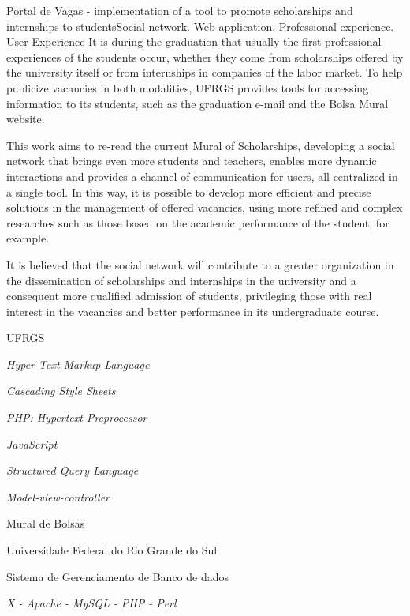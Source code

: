 \documentclass[cic,tc]{iiufrgs}
\begin{document}
\begin{englishabstract}{
Portal de Vagas - implementation of a tool to promote scholarships and internships to students}{Social network.  Web application. Professional experience. User Experience}
	It is during the graduation that usually the first professional experiences of the students occur, whether they come from scholarships offered by the university itself or from internships in companies of the labor market. To help publicize vacancies in both modalities, UFRGS provides tools for accessing information to its students, such as the graduation e-mail and the Bolsa Mural website.
    
    This work aims to re-read the current Mural of Scholarships, developing a social network that brings even more students and teachers, enables more dynamic interactions and provides a channel of communication for users, all centralized in a single tool. In this way, it is possible to develop more efficient and precise solutions in the management of offered vacancies, using more refined and complex researches such as those based on the academic performance of the student, for example.

    It is believed that the social network will contribute to a greater organization in the dissemination of scholarships and internships in the university and a consequent more qualified admission of students, privileging those with real interest in the vacancies and better performance in its undergraduate course.

\end{englishabstract}

\listoffigures

\listoftables

\begin{listofabbrv}{UFRGS}
    \item[HTML] \textit{Hyper Text Markup Language}
    \item[CSS] \textit{Cascading Style Sheets}
    \item[PHP] \textit{PHP: Hypertext Preprocessor}
    \item[JS] \textit{JavaScript}
    \item[SQL] \textit{Structured Query Language}
    \item[MVC] \textit{Model-view-controller}
    \item[MB] Mural de Bolsas
    \item[UFRGS] Universidade Federal do Rio Grande do Sul
    \item[SGBD] Sistema de Gerenciamento de Banco de dados
    \item[XAMPP] \textit{X - Apache - MySQL - PHP - Perl}
\end{listofabbrv}
\end{document}
